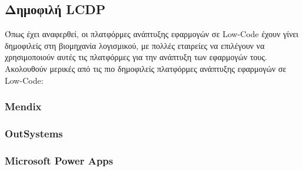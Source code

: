         \subsection{Δημοφιλή LCDP}
            Όπως έχει αναφερθεί, οι πλατφόρμες ανάπτυξης εφαρμογών σε Low-Code έχουν γίνει δημοφιλείς στη βιομηχανία λογισμικού, με πολλές εταιρείες να επιλέγουν να χρησιμοποιούν αυτές τις πλατφόρμες για την ανάπτυξη των εφαρμογών τους. Ακολουθούν μερικές από τις πιο δημοφιλείς πλατφόρμες ανάπτυξης εφαρμογών σε Low-Code:

            \subsubsection{Mendix}


            \subsubsection{OutSystems}


            \subsubsection{Microsoft Power Apps}

